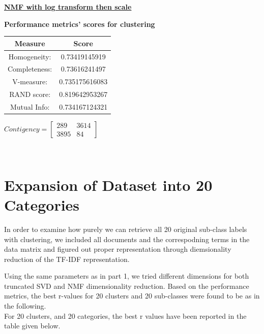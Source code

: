 \documentclass{report}
\begin{document}
\newpage

\underline{\textbf{NMF with log transform then scale}}

\begin{center}
	\textbf{Performance metrics' scores for clustering} \\ \vspace{5pt}
	\begin{tabular}{*{2}{c}}			
			\toprule
			\textbf{Measure} & \textbf{Score} \\
			\midrule			
			Homogeneity: & 0.73419145919 \\
			\midrule
			Completeness: & 0.73616241497 \\
			\midrule
			V-measure: & 0.735175616083 \\
			\midrule
			RAND score: & 0.819642953267 \\
			\midrule
			Mutual Info: & 0.734167124321 \\
			\bottomrule
	\end{tabular}
	\qquad
	$Contigency = \left[\begin{array}{*{2}{c}}
		 289 & 3614 \\
	 	 3895 & 84    
		    \end{array}\right]
    $
\end{center}
\\ \vspace{20pt}


\section*{Expansion of Dataset into 20 Categories}
In order to examine how purely we can retrieve all 20 original sub-class labels with clustering, we included all documents and the correspodning terms in the data matrix and figured out proper representation through diemsionality reduction of the TF-IDF representation.

Using the same parameters as in part 1, we tried different dimensions for both truncated SVD and NMF dimensionality reduction. Based on the performance metrics, the best r-values for 20 clusters and 20 sub-classes were found to be as in the following. \\

For 20 clusters, and 20 categories, the best r values have been reported in the table given below. \\
\end{document}
